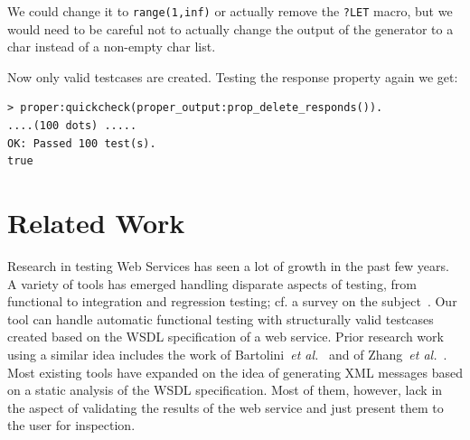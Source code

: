 \documentclass[submission,copyright,a4]{eptcs}
\newcommand{\LET}{\texttt{?LET}\xspace}
\begin{document}
We could change it to \texttt{range(1,inf)} or actually remove the
\LET macro, but we would need to be careful not to actually change the
output of the generator to a char instead of a non-empty char list.

Now only valid testcases are created. Testing the response property again we 
get:
\begin{lstlisting}
> proper:quickcheck(proper_output:prop_delete_responds()).
....(100 dots) .....
OK: Passed 100 test(s).
true
\end{lstlisting}

\section{Related Work} \label{sec:related}

Research in testing Web Services has seen a lot of growth in the past
few years. A variety of tools has emerged handling disparate aspects
of testing, from functional to integration and regression testing; cf.
a survey on the subject~\cite{SOATesting@springerlink-09}. Our tool
can handle automatic functional testing with structurally valid
testcases created based on the WSDL specification of a web service.
Prior research work using a similar idea includes the work of
Bartolini~\textit{et al.}~\cite{bartolini@ICSOC-08} and of
Zhang~\textit{et al.}~\cite{zhang@IC-08}. Most existing tools have
expanded on the idea of generating XML messages based on a static
analysis of the WSDL specification. Most of them, however, lack in the
aspect of validating the results of the web service and just present
them to the user for inspection.
\end{document}
